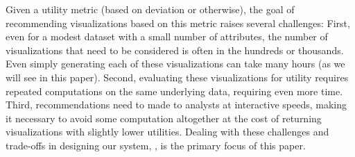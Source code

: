 

Given a utility metric (based on deviation or otherwise),
the goal of recommending visualizations based on this metric 
raises several challenges:
First, even for a modest dataset with a small number
of attributes, the number of  
visualizations that need to be considered is often in the hundreds or thousands.
Even simply generating each of these visualizations can take many hours 
(as we will see in this paper).
Second, evaluating these visualizations for utility requires repeated
computations on the same underlying data, requiring even more time.
Third, recommendations need to made to analysts at interactive speeds,
making it necessary to avoid some computation altogether at the cost
of returning visualizations with slightly lower utilities. 
Dealing with these challenges and trade-offs in designing our system, \SeeDB, is the primary focus of this paper. 







